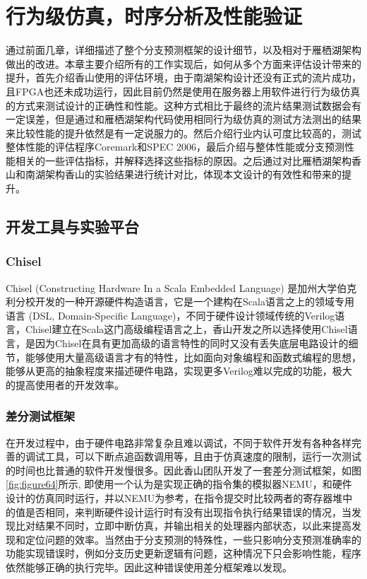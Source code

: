 \chapter{行为级仿真，时序分析及性能验证}

通过前面几章，详细描述了整个分支预测框架的设计细节，以及相对于雁栖湖架构做出的改进。本章主要介绍所有的工作实现后，如何从多个方面来评估设计带来的提升，首先介绍香山使用的评估环境，由于南湖架构设计还没有正式的流片成功，且FPGA也还未成功运行，因此目前仍然是使用在服务器上用软件进行行为级仿真的方式来测试设计的正确性和性能。这种方式相比于最终的流片结果测试数据会有一定误差，但是通过和雁栖湖架构代码使用相同行为级仿真的测试方法测出的结果来比较性能的提升依然是有一定说服力的。然后介绍行业内认可度比较高的，测试整体性能的评估程序Coremark和SPEC 2006，最后介绍与整体性能或分支预测性能相关的一些评估指标，并解释选择这些指标的原因。之后通过对比雁栖湖架构香山和南湖架构香山的实验结果进行统计对比，体现本文设计的有效性和带来的提升。

\section{开发工具与实验平台}

\subsection{Chisel}

Chisel (Constructing Hardware In a Scala Embedded Language) 是加州大学伯克利分校开发的一种开源硬件构造语言，它是一个建构在Scala语言\cite{scala}之上的领域专用语言 (DSL, Domain-Specific Language)，不同于硬件设计领域传统的Verilog语言，Chisel建立在Scala这门高级编程语言之上，香山开发之所以选择使用Chisel语言，是因为Chisel在具有更加高级的语言特性的同时又没有丢失底层电路设计的细节，能够使用大量高级语言才有的特性，比如面向对象编程和函数式编程的思想，能够从更高的抽象程度来描述硬件电路，实现更多Verilog难以完成的功能，极大的提高使用者的开发效率。

\subsection{差分测试框架}

在开发过程中，由于硬件电路非常复杂且难以调试，不同于软件开发有各种各样完善的调试工具，可以下断点追函数调用等，且由于仿真速度的限制，运行一次测试的时间也比普通的软件开发慢很多。因此香山团队开发了一套差分测试框架，如图\ref{fig:figure64}所示, 即使用一个认为是实现正确的指令集的模拟器NEMU\cite{nemu}，和硬件设计的仿真同时运行，并以NEMU为参考，在指令提交时比较两者的寄存器堆中的值是否相同，来判断硬件设计运行时有没有出现指令执行结果错误的情况，当发现比对结果不同时，立即中断仿真，并输出相关的处理器内部状态，以此来提高发现和定位问题的效率。当然由于分支预测的特殊性，一些只影响分支预测准确率的功能实现错误时，例如分支历史更新逻辑有问题，这种情况下只会影响性能，程序依然能够正确的执行完毕。因此这种错误使用差分框架难以发现。

